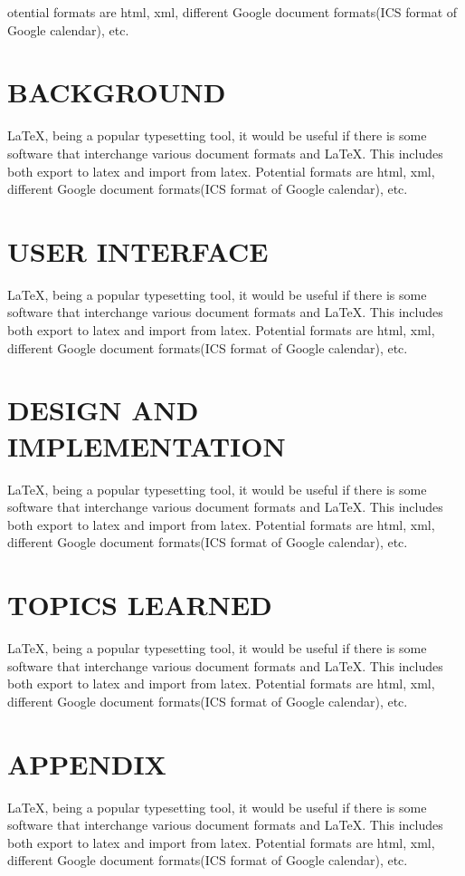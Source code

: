 \documentclass[a4paper,10pt]{mesreport}
\begin{document}
otential formats are html, xml, different Google document formats(ICS format of Google calendar), etc.

\chapter{BACKGROUND}
LaTeX, being a popular typesetting tool, it would be useful if there is some software that interchange
various document formats and LaTeX. This includes both export to latex and import from latex.
Potential formats are html, xml, different Google document formats(ICS format of Google calendar), etc.

\chapter{USER INTERFACE}
LaTeX, being a popular typesetting tool, it would be useful if there is some software that interchange
various document formats and LaTeX. This includes both export to latex and import from latex.
Potential formats are html, xml, different Google document formats(ICS format of Google calendar), etc.

\chapter{DESIGN AND IMPLEMENTATION}

LaTeX, being a popular typesetting tool, it would be useful if there is some software that interchange
various document formats and LaTeX. This includes both export to latex and import from latex.
Potential formats are html, xml, different Google document formats(ICS format of Google calendar), etc.

\chapter{TOPICS LEARNED}
LaTeX, being a popular typesetting tool, it would be useful if there is some software that interchange
various document formats and LaTeX. This includes both export to latex and import from latex.
Potential formats are html, xml, different Google document formats(ICS format of Google calendar), etc.

\chapter{APPENDIX}
LaTeX, being a popular typesetting tool, it would be useful if there is some software that interchange
various document formats and LaTeX. This includes both export to latex and import from latex.
Potential formats are html, xml, different Google document formats(ICS format of Google calendar), etc.
\cite{conference:06}



\end{document}
